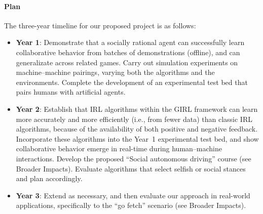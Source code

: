 
\vspace{\up}
\paragraph{Plan}

The three-year timeline for our proposed project is as follows:

\begin{itemize}
\item {\bf Year 1}: Demonstrate that a socially rational agent can
  successfully learn collaborative behavior from batches of
  demonstrations (offline), and can generalizate across related games.
  Carry out simulation experiments on machine--machine pairings,
  varying both the algorithms and the environments.  Complete the
  development of an experimental test bed that pairs humans with
  artificial agents.

\item {\bf Year 2}: Establish that IRL algorithms within the GIRL
  framework can learn more accurately and more efficiently (i.e., from
  fewer data) than classic IRL algorithms, because of the availability of
  both positive and negative feedback.
  Incorporate these algorithms into the Year~1 experimental
  test bed, and show collaborative behavior emerge in
  real-time during human--machine interactions.  Develop the proposed
  ``Social autonomous driving'' course (see Broader Impacts). Evaluate
  algorithms that select selfish or social stances and plan accordingly.

\item {\bf Year 3}: Extend as necessary, and then evaluate our
  approach in real-world applications, specifically to the ``go
  fetch'' scenario (see Broader Impacts).

\end{itemize}

